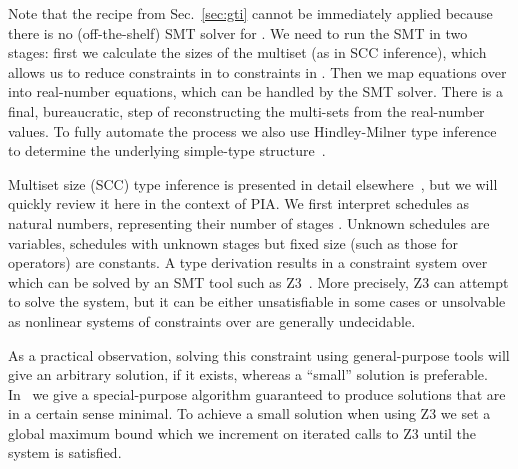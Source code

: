 \documentclass{article}
\begin{document}
Note that the recipe from Sec.~\ref{sec:gti} cannot be immediately applied because there is no (off-the-shelf) SMT solver for . We need to run the SMT in two stages: first we calculate the sizes of the multiset (as in SCC inference), which allows us to reduce constraints in  to constraints in . Then we map equations over  into real-number equations, which can be handled by the SMT solver. There is a final, bureaucratic, step of reconstructing the multi-sets from the real-number values. To fully automate the process we also use Hindley-Milner type inference to determine the underlying simple-type structure~\cite{milner1978theory}. 

Multiset size (SCC) type inference is presented in detail elsewhere~\cite{DBLP:conf/popl/GhicaS11}, but we will quickly review it here in the context of PIA. We first interpret schedules as natural numbers, representing their number of stages . Unknown schedules are variables, schedules with unknown stages but fixed size (such as those for operators) are constants. A type derivation results in a constraint system over  which can be solved by an SMT tool such as Z3~\cite{Z3}. More precisely, Z3 can attempt to solve the system, but it can be either unsatisfiable in some cases or unsolvable as nonlinear systems of constraints over  are generally undecidable. 

As a practical observation, solving this constraint using general-purpose tools will give an arbitrary solution, if it exists, whereas a ``small'' solution is preferable. In~\cite{DBLP:conf/popl/GhicaS11} we give a special-purpose algorithm guaranteed to produce solutions that are in a certain sense minimal. To achieve a small solution when using Z3 we set a global maximum bound which we increment on iterated calls to Z3 until the system is satisfied. 
\end{document}
